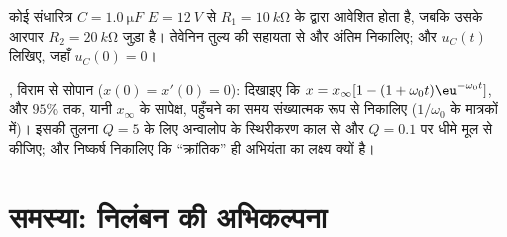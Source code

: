 \begin{exercise}[$\star\star\star$]\label{exo:b1:transient-regimes:11}
कोई संधारित्र $C = \qty{1.0}{\micro F}$ $E = \qty{12}{V}$ से
$R_1 = \qty{10}{k\ohm}$ के द्वारा आवेशित होता है, जबकि उसके आरपार $R_2 = \qty{20}{k\ohm}$
जुड़ा है। तेवेनिन तुल्य की सहायता से  और
अंतिम  निकालिए; और $u_C(t)$ लिखिए, जहाँ $u_C(0) = 0$।
\end{exercise}

\begin{exercise}[$\star\star\star$]\label{exo:b1:transient-regimes:12}
, विराम से सोपान ($x(0) = x'(0) = 0$): दिखाइए कि
$x = x_\infty[1 - (1 + \omega_0 t)\eu^{-\omega_0 t}]$, और $95\%$ तक, यानी
$x_\infty$ के सापेक्ष, पहुँचने का समय संख्यात्मक रूप से निकालिए
($1/\omega_0$ के मात्रकों में)। इसकी तुलना $Q = 5$ के लिए अन्वालोप के
स्थिरीकरण काल से और $Q = 0.1$ पर धीमे मूल से कीजिए; और निष्कर्ष निकालिए कि
``क्रांतिक'' ही अभियंता का लक्ष्य क्यों है।
\end{exercise}

\section{समस्या: निलंबन की अभिकल्पना}

